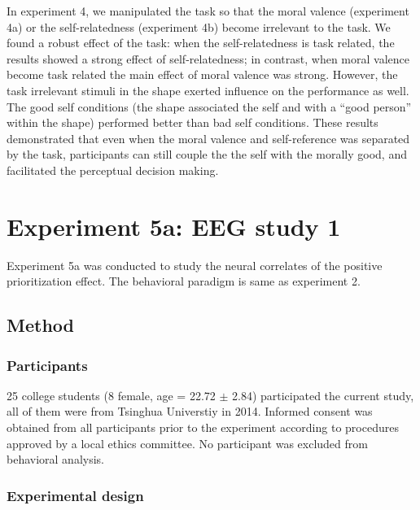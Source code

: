 \documentclass[man]{apa6}
\begin{document}
In experiment 4, we manipulated the task so that the moral valence (experiment 4a) or the self-relatedness (experiment 4b) become irrelevant to the task. We found a robust effect of the task: when the self-relatedness is task related, the results showed a strong effect of self-relatedness; in contrast, when moral valence become task related the main effect of moral valence was strong. However, the task irrelevant stimuli in the shape exerted influence on the performance as well. The good self conditions (the shape associated the self and with a \enquote{good person} within the shape) performed better than bad self conditions. These results demonstrated that even when the moral valence and self-reference was separated by the task, participants can still couple the the self with the morally good, and facilitated the perceptual decision making.

\hypertarget{experiment-5a-eeg-study-1}{%
\section{Experiment 5a: EEG study 1}\label{experiment-5a-eeg-study-1}}

Experiment 5a was conducted to study the neural correlates of the positive prioritization effect. The behavioral paradigm is same as experiment 2.

\hypertarget{method-6}{%
\subsection{Method}\label{method-6}}

\hypertarget{participants-8}{%
\subsubsection{Participants}\label{participants-8}}

25 college students (8 female, age = 22.72 \(\pm\) 2.84) participated the current study, all of them were from Tsinghua Universtiy in 2014. Informed consent was obtained from all participants prior to the experiment according to procedures approved by a local ethics committee. No participant was excluded from behavioral analysis.

\hypertarget{experimental-design-2}{%
\subsubsection{Experimental design}\label{experimental-design-2}}
\end{document}
